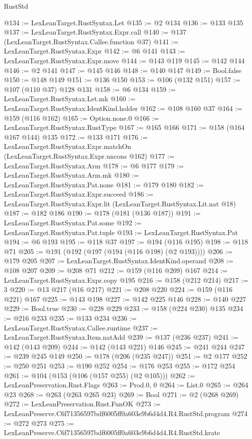 \begin{lexlean}{RustStd}
\begin{coremodule}
@134 := LexLeanTarget.RustSyntax.Let
@135 := @2 @134
@136 := @133 @135
@137 := LexLeanTarget.RustSyntax.Expr.call
@140 := @137 (LexLeanTarget.RustSyntax.Callee.function @37)
@141 := LexLeanTarget.RustSyntax.Expr
@142 := @6 @141
@143 := LexLeanTarget.RustSyntax.Expr.move
@144 := @143 @119
@145 := @142 @144
@146 := @2 @141
@147 := @145 @146
@148 := @140 @147
@149 := Bool.false
@150 := @148 @149
@151 := @136 @150
@153 := @106 (@132 @151)
@157 := @107 (@110 @37) @128 @131
@158 := @6 @134
@159 := LexLeanTarget.RustSyntax.Let.mk
@160 := LexLeanTarget.RustSyntax.IdentKind.holder
@162 := @108 @160 @37
@164 := @159 (@116 @162)
@165 := Option.none.{0}
@166 := LexLeanTarget.RustSyntax.RustType
@167 := @165 @166
@171 := @158 (@164 @167 @144) @135
@172 := @133 @171
@176 := LexLeanTarget.RustSyntax.Expr.matchOn (LexLeanTarget.RustSyntax.Expr.uncons @162)
@177 := LexLeanTarget.RustSyntax.Arm
@178 := @6 @177
@179 := LexLeanTarget.RustSyntax.Arm.mk
@180 := LexLeanTarget.RustSyntax.Pat.none
@181 := @179 @180
@182 := LexLeanTarget.RustSyntax.Expr.succeed
@186 := LexLeanTarget.RustSyntax.Expr.lit (LexLeanTarget.RustSyntax.Lit.nat @18)
@187 := @182 @186
@190 := @178 (@181 (@136 @187))
@191 := LexLeanTarget.RustSyntax.Pat.some
@192 := LexLeanTarget.RustSyntax.Pat.tuple
@193 := LexLeanTarget.RustSyntax.Pat
@194 := @6 @193
@195 := @118 @37
@197 := @194 (@116 @195)
@198 := @118 @71
@205 := @191 (@192 (@197 (@194 (@116 @198) (@2 @193))))
@206 := @179 @205
@207 := LexLeanTarget.RustSyntax.IdentKind.operand
@208 := @108 @207
@209 := @208 @71
@212 := @159 (@116 @209) @167
@214 := LexLeanTarget.RustSyntax.Expr.copy @195
@216 := @158 (@212 @214)
@217 := 3
@220 := @13 @217 (@16 @217)
@221 := @208 @220
@224 := @159 (@116 @221) @167
@225 := @143 @198
@227 := @142 @225 @146
@228 := @140 @227
@229 := Bool.true
@230 := @228 @229
@233 := @158 (@224 @230) @135
@234 := @216 @233
@235 := @133 @234
@236 := LexLeanTarget.RustSyntax.Callee.runtime
@237 := LexLeanTarget.RustSyntax.Item.natAdd
@239 := @137 (@236 @237)
@241 := @142 (@143 @209)
@244 := @142 (@143 @221) @146
@245 := @241 @244
@247 := @239 @245 @149
@250 := @178 (@206 (@235 @247))
@251 := @2 @177
@252 := @250 @251
@253 := @190 @252
@254 := @176 @253
@255 := @172 @254
@261 := @104 (@153 (@106 (@157 @255) (@2 @105)))
@262 := LexLeanPreservation.Rust.Flags
@263 := Prod.{0, 0}
@264 := List.{0}
@265 := @264 @23
@268 := @263 (@263 @265 @23)
@269 := Bool
@271 := @2 (@268 @269)
@272 := LexLeanPreservation.Rust.FunOK
@273 := LexLeanPreserve.C6f71356597bdf6005ff0a603e9b6d4d4.R4.RustStd.program
@274 := @272 @273
@275 := LexLeanPreserve.C6f71356597bdf6005ff0a603e9b6d4d4.R4.RustStd.krate

\end{coremodule}
\end{lexlean}
